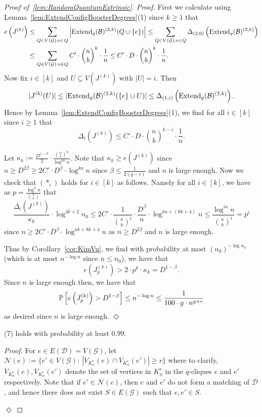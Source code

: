 \documentclass[11pt]{article}
\newcommand{\mc}[1]{\mathcal{#1}}
\newcounter{i}
\theoremstyle{plain}
\newenvironment{proofclaim}[1][]%
{\noindent \emph{Proof.} {}{#1}{}}{\hfill
	$\Diamond$\vspace{1em}}
\renewcommand{\theclaim}{\thetheorem.\arabic{claim}}
\newenvironment{lateproof}[1]
 {%
  \renewcommand{\theclaim}{\ref{#1}.\arabic{claim}}%
  \begin{proof}[Proof of~\cref{#1}]%
 }
 {\end{proof}}
\theoremstyle{plain} %
\theoremstyle{definition}
\newcommand{\Prob}[1]{\ensuremath{%
\mathbb P\left[#1\right]
}}
\begin{document}
\begin{lateproof}{lem:RandomQuantumExtrinsic}
\begin{proofclaim}
First we calculate using Lemma~\ref{lem:ExtendConfigBoosterDegrees}(1) since $k\ge 1$ that
\begin{align*}
e\left(J^{(k)}\right) &\le \sum_{Q\in V(\mc{G}):v\in Q} \left|{\rm Extend}_g(\mc{B})^{(2,k)}(Q\cup \{e\})\right|\le \sum_{Q\in V(\mc{G}):v\in Q} \Delta_{(2,0)}\left({\rm Extend}_g(\mc{B})^{(2,k)}\right) \\
&\le \sum_{Q\in V(\mc{G}):v\in Q} C'\cdot \binom{n}{b}^{k}\cdot \frac{1}{n} \le C'\cdot D\cdot \binom{n}{b}^{k}\cdot \frac{1}{n}.
\end{align*}
Now fix $i\in [k]$ and $U\subseteq V(J^{(k)})$ with $|U|=i$. Then
$$|J^{(k)}(U)| \le |{\rm Extend}_g(\mc{B})^{(2,k)}(\{e\}\cup U)| \le \Delta_{(1,i)}\left({\rm Extend}_g(\mc{B})^{(2,k)}\right).$$
Hence by Lemma~\ref{lem:ExtendConfigBoosterDegrees}(1), we find for all $i\in [k]$ since $i\ge 1$ that
$$\Delta_i\left(J^{(k)}\right) \le C'\cdot D\cdot \binom{n}{b}^{k-i}\cdot \frac{1}{n}.$$

Let $\kappa_k:= \frac{D^{1-\beta}}{2} \cdot \frac{\binom{n}{b}^k}{\log^{ka} n}$. Note that $\kappa_k\ge e\left(J^{(k)}\right)$ since $n \ge D^{2\beta} \ge 2C'\cdot D^{\beta} \cdot \log^{ka} n$ since $\beta \le \frac{1}{2(q-r)}$ and $n$ is large enough. Now we check that $(*_i)$ holds for $i\in [k]$ as follows. Namely for all $i\in [k]$, we have as $p=\frac{\log^a n}{\binom{n}{b}}$ that
$$\frac{\Delta_i\left(J^{(k)}\right)}{\kappa_k}\cdot \log^{4k+2}n_0\le 2C'\cdot \frac{1}{\binom{n}{b}^i}\cdot \frac{D^{\beta}}{n} \cdot \log^{ka+(8k+4)}n \le \frac{\log^{ia} n}{\binom{n}{b}^i} = p^i$$ since $n \ge 2C'\cdot D^{\beta} \cdot \log^{ak+8k+4} n$ as $n\ge D^{2\beta}$ and $n$ is large enough. 

Thus by Corollary~\ref{cor:KimVu}, we find with probability at most
$(n_0)^{-\log n_0}$ (which is at most $n^{-\log n}$ since $n\le n_0$), we have that
$$e\left(J^{(k)}_p\right) > 2\cdot p^k\cdot \kappa_k = D^{1-\beta}.$$ 
Since $n$ is large enough then, we have that
$$\Prob{e\left(J^{(k)}_p\right) > D^{1-\beta} }\le n^{-\log n} \le  \frac{1}{100\cdot g\cdot n^{q+r}}$$
as desired since $n$ is large enough.
\end{proofclaim}


\begin{claim}\label{cl:11Holds}
(7) holds with probability at least $0.99$.    
\end{claim}
\begin{proofclaim}
For $e\in E(\mc{D})=V(\mc{G})$, let $\mc{N}(e):= \{e'\in V(\mc{G}):~|V_{K_n^r}(e)\cap V_{K_n^r}(e')| \ge r\}$ where to clarify, $V_{K_n^r}(e), V_{K_n^r}(e')$ denote the set of vertices in $K_n^r$ in the $q$-cliques $e$ and $e'$ respectively. Note that if $e'\in \mc{N}(e)$, then $e$ and $e'$ do not form a matching of $\mc{D}$, and hence there does not exist $S\in E(\mc{G})$ such that $e,e'\in S$.


\end{proofclaim}
\end{lateproof}
\end{document}
